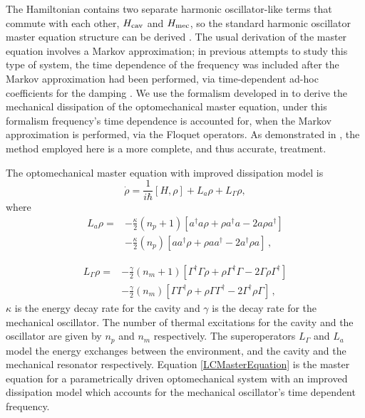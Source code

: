 \documentclass[reprint, amsmath,amssymb, aps,pra]{revtex4-1}
\begin{document}
The Hamiltonian contains two separate harmonic oscillator-like terms
that commute with each other, $H_{\rm cav}$ and $H_{\rm mec}$, so the
standard harmonic oscillator master equation structure can be derived
\cite{TesisMaestria}\cite{HanngiFM}. The usual derivation of the
master equation involves a Markov approximation; in previous attempts
to study this type of system, the time dependence of the frequency was
included after the Markov approximation had been performed, via
time-dependent ad-hoc coefficients for the damping \cite{BarberisLC}.
We use the formalism developed in \cite{HanngiFM} to derive the
mechanical dissipation of the optomechanical master equation, under
this formalism frequency's time dependence is accounted for, when the
Markov approximation is performed, via the Floquet operators. As
demonstrated in \cite{HanngiFM}, the method employed here is a more
complete, and thus accurate, treatment.

The optomechanical master equation with improved dissipation model is
\begin{equation} \label{LCMasterEquation}
\dot{\rho} = \frac{1}{i\hbar}[H,\rho] +L_a\rho + L_\Gamma \rho,
\end{equation}
where
\begin{align}
L_a \rho =& - \frac{\kappa}{2}(n_p + 1)[a^\dagger a\rho + \rho a^\dagger a -2a\rho a^\dagger]  \\
 &- \frac{\kappa}{2}(n_p)[ aa^\dagger\rho + \rho  aa^\dagger -2a^\dagger\rho a]\, ,\nonumber
\end{align}

\begin{align}\label{eq:mechanical_dissipation}
  L_\Gamma \rho =& - \frac{\gamma}{2}(n_m + 1)[\Gamma^\dagger \Gamma\rho + \rho \Gamma^\dagger \Gamma -2\Gamma\rho \Gamma^\dagger]  \\
                 &- \frac{\gamma}{2}(n_m)[ \Gamma\Gamma^\dagger\rho + \rho  \Gamma\Gamma^\dagger -2\Gamma^\dagger\rho \Gamma]\, ,\nonumber
\end{align} 
$\kappa$ is the energy decay rate for the cavity and $\gamma$ is the
decay rate for the mechanical oscillator. The number of thermal
excitations for the cavity and the oscillator are given by $n_p$ and
$n_m$ respectively. The superoperators $L_\Gamma$ and $L_a$ model the
energy exchanges between the environment, and the cavity and the
mechanical resonator respectively. Equation \eqref{LCMasterEquation}
is the master equation for a parametrically driven optomechanical
system with an improved dissipation model which accounts for the
mechanical oscillator's time dependent frequency.
\end{document}
